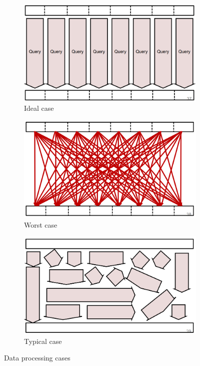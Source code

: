 \documentclass[11pt,oneside,a4paper]{article}
\begin{document}
\begin{figure}[hb!]
	\centering
	\begin{subfigure}[t]{.3\textwidth}
		\centering
		\includegraphics[width=0.9\linewidth]{figures/mr_ideal}
		\caption{Ideal case}
		\label{fig:mrideal}
	\end{subfigure}%
	\begin{subfigure}[t]{.3\textwidth}
		\centering
		\includegraphics[width=0.9\linewidth]{figures/mr_worst}
		\caption{Worst case}
		\label{fig:mrworst}
	\end{subfigure}
	\begin{subfigure}[t]{.3\textwidth}
		\centering
		\includegraphics[width=0.9\linewidth]{figures/mr_typical}
		\caption{Typical case}
		\label{fig:mrtypical}
	\end{subfigure}
	\caption{Data processing cases}
\end{figure}
\end{document}
